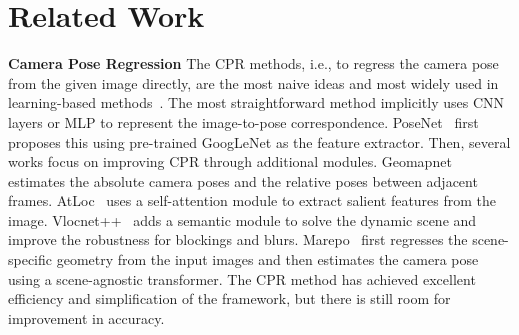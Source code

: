 \section{Related Work}
\textbf{Camera Pose Regression} The CPR methods, i.e., to regress the camera pose from the given image directly, are the most naive ideas and most widely used in learning-based methods~\cite{kendall2015posenet,brachmann2016uncertainty,brahmbhatt2017mapnet,melekhov2017image,radwan2018vlocnet++,wang2020atloc,hu2020dasgil,arnold2022map,chen2022dfnet,shavit2022camera}. The most straightforward method implicitly uses CNN layers or MLP to represent the image-to-pose correspondence. PoseNet~\cite{kendall2015posenet} first proposes this using pre-trained GoogLeNet as the feature extractor. Then, several works focus on improving CPR through additional modules. Geomapnet~\cite{brahmbhatt2017mapnet} estimates the absolute camera poses and the relative poses between adjacent frames. AtLoc~\cite{wang2020atloc} uses a self-attention module to extract salient features from the image. Vlocnet++~\cite{radwan2018vlocnet++} adds a semantic module to solve the dynamic scene and improve the robustness for blockings and blurs. 
Marepo~\cite{chen2024marepo} first regresses the scene-specific geometry from the input images and then estimates the camera pose using a scene-agnostic transformer. 
The CPR method has achieved excellent efficiency and simplification of the framework, but there is still room for improvement in accuracy. 

